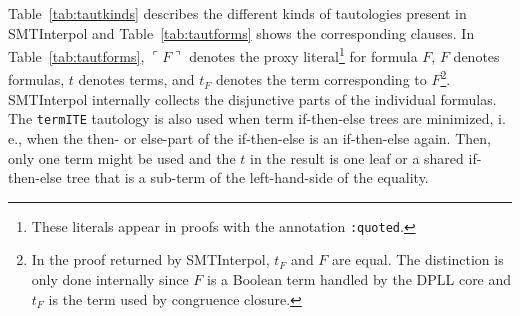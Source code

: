 \documentclass[a4paper]{article}
\newcommand\si{SMTInterpol\xspace}
\newcommand\quoted[1]{\ulcorner #1 \urcorner}
\begin{document}
Table~\ref{tab:tautkinds} describes the different kinds of tautologies present
in \si and Table~\ref{tab:tautforms} shows the corresponding clauses.  In
Table~\ref{tab:tautforms}, $\quoted{F}$ denotes the proxy
literal\footnote{These literals appear in proofs with the annotation
  \texttt{:quoted}.} for formula $F$, $F$ denotes formulas, $t$ denotes terms,
and $t_F$ denotes the term corresponding to $F$\footnote{In the proof returned
  by \si, $t_F$ and $F$ are equal.  The distinction is only done internally
  since $F$ is a Boolean term handled by the DPLL core and $t_F$ is the term
  used by congruence closure.}.
\si internally collects the disjunctive parts of the individual formulas.  The
\texttt{termITE} tautology is also used when term if-then-else trees are
minimized, i.\,e., when the then- or else-part of the if-then-else is an
if-then-else again.  Then, only one term might be used and the $t$ in the
result is one leaf or a shared if-then-else tree that is a sub-term of the
left-hand-side of the equality.
\end{document}
